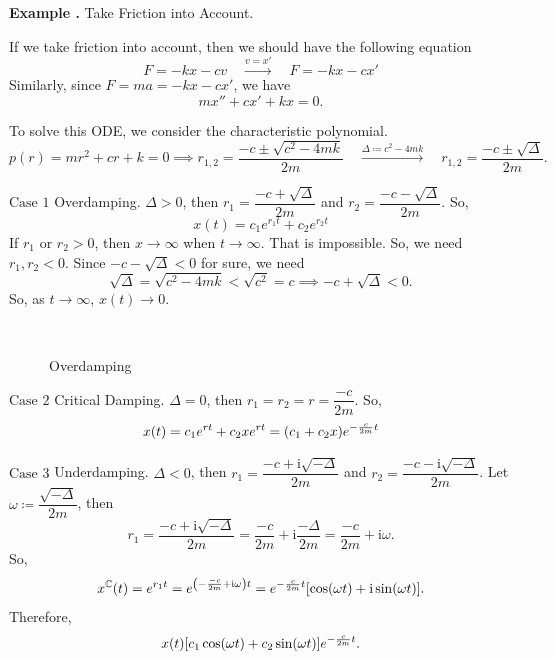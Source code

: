 \documentclass[12pt, a4paper]{article}
\newcounter{index}[subsection]
\newenvironment*{eg}{\begin{framed}\par\noindent\textbf{Example \thesubsection.\stepcounter{index}\theindex}}{\par\end{framed}}
\def\C{{\mathbb{C}}}
\def\i{{\mathrm{i}}}
\begin{document}
\begin{eg}
	Take Friction into Account. \par 
	If we take friction into account, then we should have the following equation \[F=-kx-cv\quad\xrightarrow{v=x'}\quad F=-kx-cx'\] Similarly, since $F=ma=-kx-cx'$, we have \[mx''+cx'+kx=0.\]\par 
	To solve this ODE, we consider the characteristic polynomial. \[p(r)=mr^2+cr+k=0\implies r_{1,2}=\dfrac{-c\pm\sqrt{c^2-4mk}}{2m}\quad\xrightarrow{\Delta\coloneqq c^2-4mk}\quad r_{1,2}=\dfrac{-c\pm\sqrt{\Delta}}{2m}.\]\par 
	$\boxed{\text{Case }1}$ Overdamping. $\Delta>0$, then $r_1=\dfrac{-c+\sqrt{\Delta}}{2m}$ and $r_2=\dfrac{-c-\sqrt{\Delta}}{2m}$. So, \[x(t)=c_1e^{r_1t}+c_2e^{r_2t}\] If $r_1$ or $r_2>0$, then $x\to\infty$ when $t\to\infty$. That is impossible. So, we need $r_1,r_2<0$. Since $-c-\sqrt{\Delta}<0$ for sure, we need \[\sqrt{\Delta}=\sqrt{c^2-4mk}<\sqrt{c^2}=c\implies-c+\sqrt{\Delta}<0.\] So, as $t\to\infty$, $x(t)\to0$.
	\begin{figure}[H]\centering
		$\qquad$\label{overdamping1}
		\hfill
		\label{overdamping2}$\qquad$
		\caption{Overdamping}
	\end{figure}\par 
	$\boxed{\text{Case }2}$ Critical Damping. $\Delta=0$, then $r_1=r_2=r=\dfrac{-c}{2m}$. So, \[x(t)=c_1e^{rt}+c_2xe^{rt}=\qty(c_1+c_2x)e^{-\frac{c}{2m}t}\]\par 
	$\boxed{\text{Case }3}$ Underdamping. $\Delta<0$, then $r_1=\dfrac{-c+\i\sqrt{-\Delta}}{2m}$ and $r_2=\dfrac{-c-\i\sqrt{-\Delta}}{2m}$. Let $\omega\coloneqq\dfrac{\sqrt{-\Delta}}{2m}$, then \[r_1=\dfrac{-c+\i\sqrt{-\Delta}}{2m}=\dfrac{-c}{2m}+\i\dfrac{-\Delta}{2m}=\dfrac{-c}{2m}+\i\omega.\] So, \[x^\C(t)=e^{r_1t}=e^{\qty(-\frac{-c}{2m}+\i\omega)t}=e^{-\frac{c}{2m}t}\qty[\cos(\omega t)+\i\sin(\omega t)].\] Therefore, \[x(t)\qty[c_1\cos(\omega t)+c_2\sin(\omega t)]e^{-\frac{c}{2m}t}.\]

\end{eg}
\end{document}
